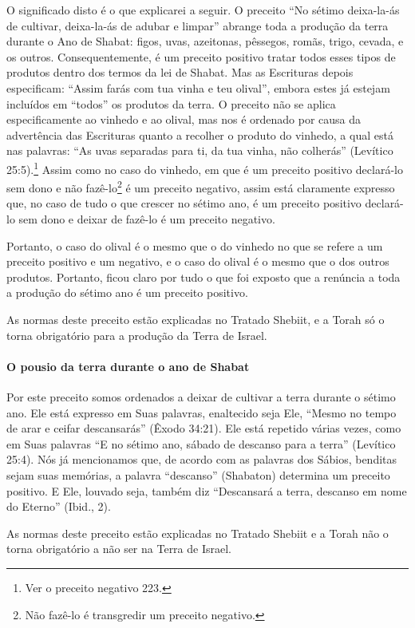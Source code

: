 O significado disto é o que explicarei a seguir. O preceito ``No sétimo
deixa-la-ás de cultivar, deixa-la-ás de adubar e limpar'' abrange toda a
produção da terra durante o Ano de Shabat: figos, uvas, azeitonas,
pêssegos, romãs, trigo, cevada, e os outros. Consequentemente, é um
preceito positivo tratar todos esses tipos de produtos dentro dos
termos da lei de Shabat. Mas as Escrituras depois especificam: ``Assim
farás com tua vinha e teu olival'', embora estes já estejam incluídos
em ``todos'' os produtos da terra. O preceito não se aplica
especificamente ao vinhedo e ao olival, mas nos é ordenado por causa
da advertência das Escrituras quanto a recolher o produto do vinhedo, a
qual está nas palavras: ``As uvas separadas para ti, da tua vinha, não
colherás'' (Levítico 25:5).\footnote{Ver o preceito negativo 223.} Assim como no caso do vinhedo, em que é
um preceito positivo declará-lo sem dono e não
fazê-lo\footnote{Não fazê-lo é transgredir um preceito negativo.} é um preceito negativo, assim está claramente expresso que, no caso de tudo o que crescer no sétimo ano, é um preceito positivo declará-lo sem dono e deixar de fazê-lo é um preceito negativo.

Portanto, o caso do olival é o mesmo que o do vinhedo no que se refere a
um preceito positivo e um negativo, e o caso do olival é o mesmo que o
dos outros produtos. Portanto, ficou claro por tudo o que foi exposto
que a renúncia a toda a produção do sétimo ano é um preceito positivo.

As normas deste preceito estão explicadas no Tratado Shebiit, e a Torah
só o torna obrigatório para a produção da Terra de Israel.

\paragraph{O pousio da terra durante o ano de Shabat}

Por este preceito somos ordenados a deixar de cultivar a terra durante
o sétimo ano. Ele está expresso em Suas palavras, enaltecido seja Ele,
``Mesmo no tempo de arar e ceifar descansarás'' (Êxodo 34:21). Ele está
repetido várias vezes, como em Suas palavras ``E no sétimo ano, sábado
de descanso para a terra'' (Levítico 25:4). Nós já mencionamos que, de
acordo com as palavras dos Sábios, benditas sejam suas memórias, a
palavra ``descanso'' (Shabaton) determina um preceito positivo. E Ele,
louvado seja, também diz ``Descansará a terra, descanso em nome do
Eterno'' (Ibid., 2).

As normas deste preceito estão explicadas no Tratado Shebiit e a Torah
não o torna obrigatório a não ser na Terra de Israel.

